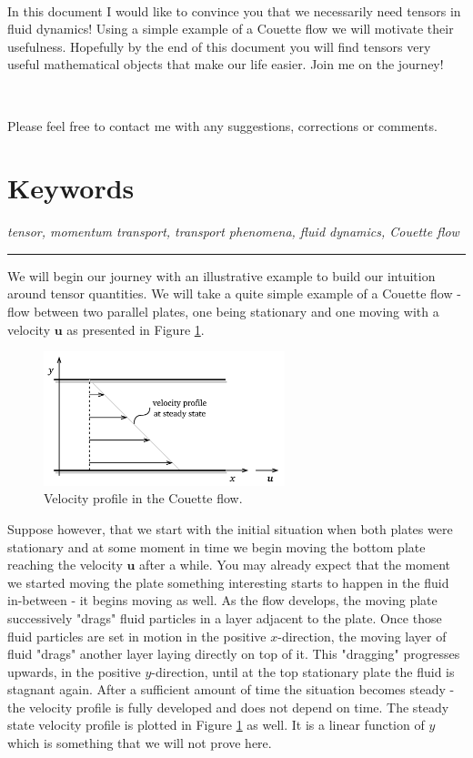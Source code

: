 \documentclass[10pt,twocolumn]{article}
\begin{document}
\,\,

In this document I would like to convince you that we necessarily need tensors in fluid dynamics! Using a simple example of a Couette flow we will motivate their usefulness. Hopefully by the end of this document you will find tensors very useful mathematical objects that make our life easier. Join me on the journey!

\,\,

Please feel free to contact me with any suggestions, corrections or comments.

\section*{Keywords}

\textit{tensor, momentum transport, transport phenomena, fluid dynamics, Couette flow}


\vspace{5mm}

{\rule{8.6cm}{0.5pt}}

\vspace{5mm}

We will begin our journey with an illustrative example to build our intuition around tensor quantities. We will take a quite simple example of a Couette flow - flow between two parallel plates, one being stationary and one moving with a velocity $\mathbf{u}$ as presented in Figure \ref{fig:couette-flow}.
\begin{figure}[H]
\centering\includegraphics[width=7cm]{couette-flow.png}
\caption{Velocity profile in the Couette flow.}
\label{fig:couette-flow}
\end{figure}
Suppose however, that we start with the initial situation when both plates were stationary and at some moment in time we begin moving the bottom plate reaching the velocity $\mathbf{u}$ after a while. You may already expect that the moment we started moving the plate something interesting starts to happen in the fluid in-between - it begins moving as well. As the flow develops, the moving plate successively "drags" fluid particles in a layer adjacent to the plate. Once those fluid particles are set in motion in the positive $x$-direction, the moving layer of fluid "drags" another layer laying directly on top of it. This "dragging" progresses upwards, in the positive $y$-direction, until at the top stationary plate the fluid is stagnant again. After a sufficient amount of time the situation becomes steady - the velocity profile is fully developed and does not depend on time. The steady state velocity profile is plotted in Figure \ref{fig:couette-flow} as well. It is a linear function of $y$ which is something that we will not prove here.
\end{document}
